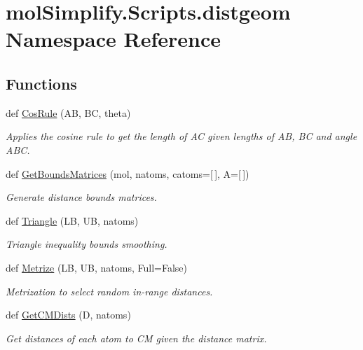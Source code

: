 \hypertarget{namespacemolSimplify_1_1Scripts_1_1distgeom}{}\section{mol\+Simplify.\+Scripts.\+distgeom Namespace Reference}
\label{namespacemolSimplify_1_1Scripts_1_1distgeom}
\subsection*{Functions}
\begin{DoxyCompactItemize}
\item 
def \hyperlink{namespacemolSimplify_1_1Scripts_1_1distgeom_a755cf7c0dbe32d75e3aa2c43ce1b8093}{Cos\+Rule} (AB, BC, theta)
\begin{DoxyCompactList}\small\item\em Applies the cosine rule to get the length of AC given lengths of AB, BC and angle A\+BC. \end{DoxyCompactList}\item 
def \hyperlink{namespacemolSimplify_1_1Scripts_1_1distgeom_a511e618a1e62d7d1ad97e26692c62a42}{Get\+Bounds\+Matrices} (mol, natoms, catoms=\mbox{[}$\,$\mbox{]}, A=\mbox{[}$\,$\mbox{]})
\begin{DoxyCompactList}\small\item\em Generate distance bounds matrices. \end{DoxyCompactList}\item 
def \hyperlink{namespacemolSimplify_1_1Scripts_1_1distgeom_a98a435bf4a8610164d5ba4dccf61f473}{Triangle} (LB, UB, natoms)
\begin{DoxyCompactList}\small\item\em Triangle inequality bounds smoothing. \end{DoxyCompactList}\item 
def \hyperlink{namespacemolSimplify_1_1Scripts_1_1distgeom_ad4130e9756e5c59f610fa85188697e88}{Metrize} (LB, UB, natoms, Full=False)
\begin{DoxyCompactList}\small\item\em Metrization to select random in-\/range distances. \end{DoxyCompactList}\item 
def \hyperlink{namespacemolSimplify_1_1Scripts_1_1distgeom_a2bc5f7df82d7e489c9d6c56e743dd4de}{Get\+C\+M\+Dists} (D, natoms)
\begin{DoxyCompactList}\small\item\em Get distances of each atom to CM given the distance matrix. \end{DoxyCompactList}\item 

\end{DoxyCompactItemize}
